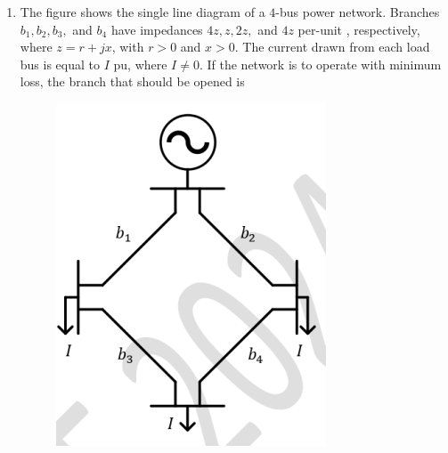 \documentclass[journal,12pt,onecolumn]{IEEEtran}
\theoremstyle{remark}
\begin{document}
\begin{enumerate}[start=1, label=Q.\arabic*]
    \hfill{}
\item The figure shows the single line diagram of a $4$-bus power network. Branches $b_1, b_2, b_3,$ and $b_4$ have impedances $4z, z, 2z,$ and $4z$ per-unit , respectively, where $z = r + jx$, with $r > 0$ and $x > 0$. The current drawn from each load bus  is equal to $I$ pu, where $I \neq 0$. If the network is to operate with minimum loss, the branch that should be opened is
    \begin{figure}[H]
        \centering
        \includegraphics[width=0.5\columnwidth]{Figures/q19.png}
        \caption{}
    \end{figure}
    \begin{enumerate}
    \end{enumerate}

    \hfill{}


\end{enumerate}
\end{document}
